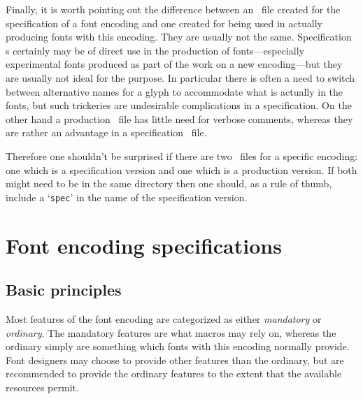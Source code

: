 \documentclass[a4paper]{article}
\DeclareRobustCommand\ETX{\textsmaller{ETX}}
\begin{document}
Finally, it is worth pointing out the difference between an \ETX\ file 
created for the specification of a font encoding and one created for 
being used in actually producing fonts with this encoding. They are 
usually not the same. Specification \ETX s certainly may be of direct 
use in the production of fonts---especially experimental fonts 
produced as part of the work on a new encoding---but they are usually 
not ideal for the purpose. In particular there is often a need to 
switch between alternative names for a glyph to accommodate what is 
actually in the fonts, but such trickeries are undesirable 
complications in a specification. On the other hand a production 
\ETX\ file has little need for verbose comments, whereas they are rather 
an advantage in a specification \ETX\ file.

Therefore one shouldn't be surprised if there are two \ETX\ files for a 
specific encoding: one which is a specification version and one which 
is a production version. If both might need to be in the same 
directory then one should, as a rule of thumb, include a 
`\texttt{spec}' in the name of the specification version.


\section{Font encoding specifications}
\label{Sec:FontEncSpec}

\subsection{Basic principles}

Most features of the font encoding are categorized as either 
\emph{mandatory} or \emph{ordinary}. The mandatory features are what 
macros may rely on, whereas the ordinary simply are something which 
fonts with this encoding normally provide. Font designers may choose 
to provide other features than the ordinary, but are recommended to 
provide the ordinary features to the extent that the available 
resources permit.
\end{document}
